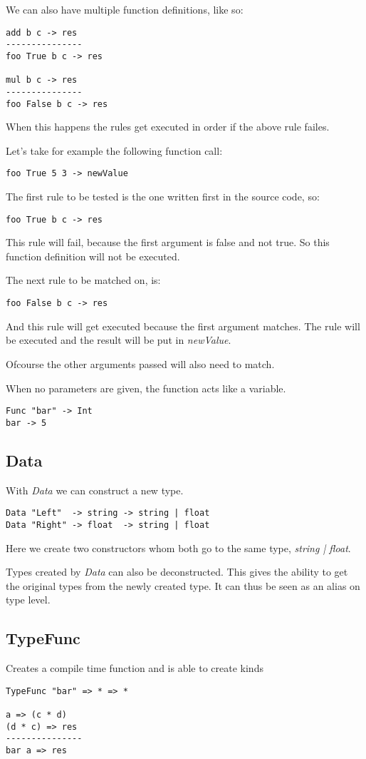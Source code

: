 We can also have multiple function definitions, like so:
\begin{lstlisting}
add b c -> res
---------------
foo True b c -> res

mul b c -> res
---------------
foo False b c -> res
\end{lstlisting}

When this happens the rules get executed in order if the above rule failes.

Let's take for example the following function call:
\begin{lstlisting}
foo True 5 3 -> newValue
\end{lstlisting}

The first rule to be tested is the one written first in the source code, so:
\begin{lstlisting}
foo True b c -> res
\end{lstlisting}
This rule will fail, because the first argument is false and not true.
So this function definition will not be executed.

The next rule to be matched on, is:
\begin{lstlisting}
foo False b c -> res
\end{lstlisting}
And this rule will get executed because the first argument matches.
The rule will be executed and the result will be put in \emph{newValue}.

Ofcourse the other arguments passed will also need to match.

When no parameters are given, the function acts like a variable.
\begin{lstlisting}
Func "bar" -> Int
bar -> 5
\end{lstlisting}

\subsection{Data}
With \emph{Data} we can construct a new type.
\begin{lstlisting}
Data "Left"  -> string -> string | float
Data "Right" -> float  -> string | float
\end{lstlisting}
Here we create two constructors whom both go to the same type, \emph{string | float}.

Types created by \emph{Data} can also be deconstructed.
This gives the ability to get the original types from the newly created type.
It can thus be seen as an alias on type level.

\subsection{TypeFunc}
Creates a compile time function and is able to create kinds
\begin{lstlisting}
TypeFunc "bar" => * => *

a => (c * d)
(d * c) => res
---------------
bar a => res
\end{lstlisting}

